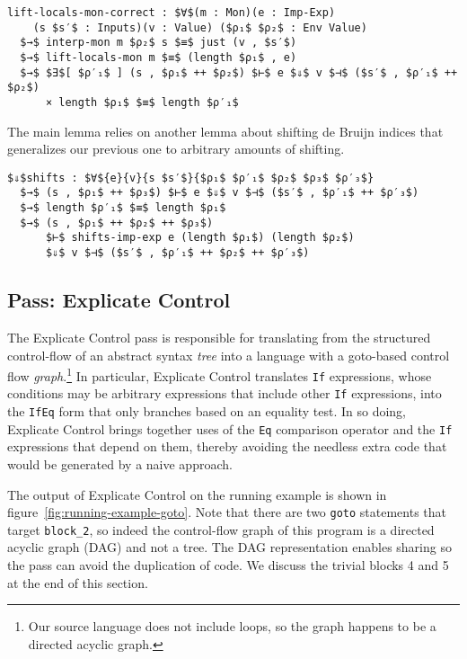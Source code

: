 \documentclass[sigplan,review,dvipsnames,screen,10pt]{acmart}
\begin{document}
\begin{lstlisting}
lift-locals-mon-correct : $∀$(m : Mon)(e : Imp-Exp)
    (s $s′$ : Inputs)(v : Value) ($ρ₁$ $ρ₂$ : Env Value)
  $→$ interp-mon m $ρ₂$ s $≡$ just (v , $s′$)
  $→$ lift-locals-mon m $≡$ (length $ρ₁$ , e)
  $→$ $∃$[ $ρ′₁$ ] (s , $ρ₁$ ++ $ρ₂$) $⊢$ e $⇓$ v $⊣$ ($s′$ , $ρ′₁$ ++ $ρ₂$)
      × length $ρ₁$ $≡$ length $ρ′₁$
\end{lstlisting}

The main lemma relies on another lemma about shifting de Bruijn
indices that generalizes our previous one to arbitrary amounts of
shifting.

\begin{lstlisting}
$⇓$shifts : $∀${e}{v}{s $s′$}{$ρ₁$ $ρ′₁$ $ρ₂$ $ρ₃$ $ρ′₃$} 
  $→$ (s , $ρ₁$ ++ $ρ₃$) $⊢$ e $⇓$ v $⊣$ ($s′$ , $ρ′₁$ ++ $ρ′₃$)
  $→$ length $ρ′₁$ $≡$ length $ρ₁$
  $→$ (s , $ρ₁$ ++ $ρ₂$ ++ $ρ₃$)
      $⊢$ shifts-imp-exp e (length $ρ₁$) (length $ρ₂$)
      $⇓$ v $⊣$ ($s′$ , $ρ′₁$ ++ $ρ₂$ ++ $ρ′₃$)
\end{lstlisting}


\subsection{Pass: Explicate Control}

The Explicate Control pass is responsible for translating from the
structured control-flow of an abstract syntax \emph{tree} into a
language with a goto-based control flow \emph{graph}.\footnote{Our
source language does not include loops, so the graph happens to be a
directed acyclic graph.} In particular, Explicate Control translates
\lstinline{If} expressions, whose conditions may be arbitrary
expressions that include other \lstinline{If} expressions, into the
\lstinline{IfEq} form that only branches based on an equality test. In
so doing, Explicate Control brings together uses of the \lstinline{Eq}
comparison operator and the \lstinline{If} expressions that depend on
them, thereby avoiding the needless extra code that would be generated
by a naive approach.

The output of Explicate Control on the running example is shown in
figure~\ref{fig:running-example-goto}. Note that there are two
\lstinline{goto} statements that target \lstinline{block_2}, so indeed
the control-flow graph of this program is a directed acyclic graph
(DAG) and not a tree. The DAG representation enables sharing so the
pass can avoid the duplication of code. We discuss the trivial blocks
4 and 5 at the end of this section.
\end{document}
